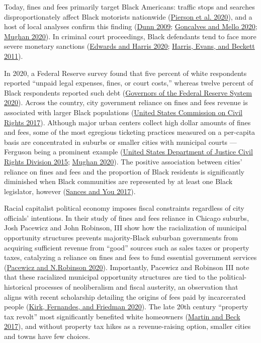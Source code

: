 \documentclass[
  12pt,
]{article}
\begin{document}
Today, fines and fees primarily target Black Americans: traffic stops and searches disproportionately affect Black motorists nationwide (\protect\hyperlink{ref-Pierson2020}{Pierson et al. 2020}), and a host of local analyses confirm this finding (\protect\hyperlink{ref-Dunn2009}{Dunn 2009}; \protect\hyperlink{ref-Goncalves2020}{Goncalves and Mello 2020}; \protect\hyperlink{ref-Mughan2020}{Mughan 2020}). In criminal court proceedings, Black defendants tend to face more severe monetary sanctions (\protect\hyperlink{ref-Edwards2020}{Edwards and Harris 2020}; \protect\hyperlink{ref-Harris2011}{Harris, Evans, and Beckett 2011}).

In 2020, a Federal Reserve survey found that five percent of white respondents reported ``unpaid legal expenses, fines, or court costs,'' whereas twelve percent of Black respondents reported such debt (\protect\hyperlink{ref-BoardofGovernorsoftheFederalReserveSystem2020}{Governors of the Federal Reserve System 2020}). Across the country, city government reliance on fines and fees revenue is associated with larger Black populations (\protect\hyperlink{ref-UnitedStatesCommissiononCivilRights2017}{United States Commission on Civil Rights 2017}). Although major urban centers collect high dollar amounts of fines and fees, some of the most egregious ticketing practices measured on a per-capita basis are concentrated in suburbs or smaller cities with municipal courts --- Ferguson being a prominent example (\protect\hyperlink{ref-UnitedStatesDepartmentofJusticeCivilRightsDivision2015}{United States Department of Justice Civil Rights Division 2015}; \protect\hyperlink{ref-Mughan2020}{Mughan 2020}). The positive association between cities' reliance on fines and fees and the proportion of Black residents is significantly diminished when Black communities are represented by at least one Black legislator, however (\protect\hyperlink{ref-Sances2017}{Sances and You 2017}).

Racial capitalist political economy imposes fiscal constraints regardless of city officials' intentions. In their study of fines and fees reliance in Chicago suburbs, Josh Pacewicz and John Robinson, III show how the racialization of municipal opportunity structures prevents majority-Black suburban governments from acquiring sufficient revenue from ``good'' sources such as sales taxes or property taxes, catalyzing a reliance on fines and fees to fund essential government services (\protect\hyperlink{ref-Pacewicz2020}{Pacewicz and N.Robinson 2020}). Importantly, Pacewicz and Robinson III note that these racialized municipal opportunity structures are tied to the political-historical processes of neoliberalism and fiscal austerity, an observation that aligns with recent scholarship detailing the origins of fees paid by incarcerated people (\protect\hyperlink{ref-Kirk2020}{Kirk, Fernandes, and Friedman 2020}). The late 20th century ``property tax revolt'' most significantly benefited white homeowners (\protect\hyperlink{ref-Martin2017}{Martin and Beck 2017}), and without property tax hikes as a revenue-raising option, smaller cities and towns have few choices.
\end{document}
